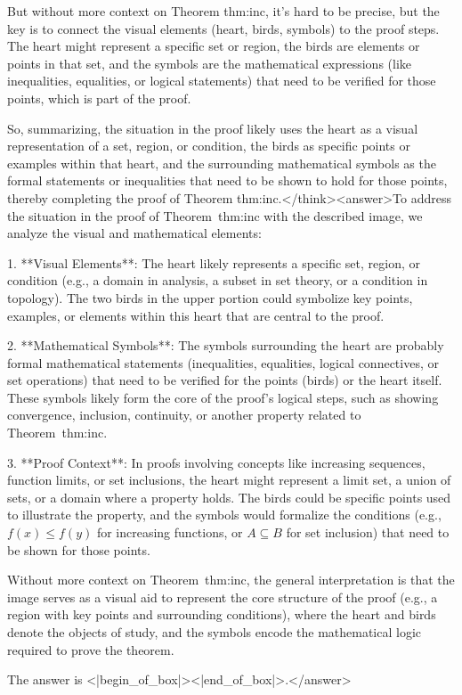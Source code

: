 But without more context on Theorem thm:inc, it's hard to be precise, but the key is to connect the visual elements (heart, birds, symbols) to the proof steps. The heart might represent a specific set or region, the birds are elements or points in that set, and the symbols are the mathematical expressions (like inequalities, equalities, or logical statements) that need to be verified for those points, which is part of the proof. 

So, summarizing, the situation in the proof likely uses the heart as a visual representation of a set, region, or condition, the birds as specific points or examples within that heart, and the surrounding mathematical symbols as the formal statements or inequalities that need to be shown to hold for those points, thereby completing the proof of Theorem thm:inc.</think><answer>To address the situation in the proof of Theorem~thm:inc with the described image, we analyze the visual and mathematical elements:  

1. **Visual Elements**: The heart likely represents a specific set, region, or condition (e.g., a domain in analysis, a subset in set theory, or a condition in topology). The two birds in the upper portion could symbolize key points, examples, or elements within this heart that are central to the proof.  

2. **Mathematical Symbols**: The symbols surrounding the heart are probably formal mathematical statements (inequalities, equalities, logical connectives, or set operations) that need to be verified for the points (birds) or the heart itself. These symbols likely form the core of the proof’s logical steps, such as showing convergence, inclusion, continuity, or another property related to Theorem~thm:inc.  

3. **Proof Context**: In proofs involving concepts like increasing sequences, function limits, or set inclusions, the heart might represent a limit set, a union of sets, or a domain where a property holds. The birds could be specific points used to illustrate the property, and the symbols would formalize the conditions (e.g., \( f(x) \leq f(y) \) for increasing functions, or \( A \subseteq B \) for set inclusion) that need to be shown for those points.  

Without more context on Theorem~thm:inc, the general interpretation is that the image serves as a visual aid to represent the core structure of the proof (e.g., a region with key points and surrounding conditions), where the heart and birds denote the objects of study, and the symbols encode the mathematical logic required to prove the theorem.  

The answer is <|begin_of_box|><|end_of_box|>.</answer>